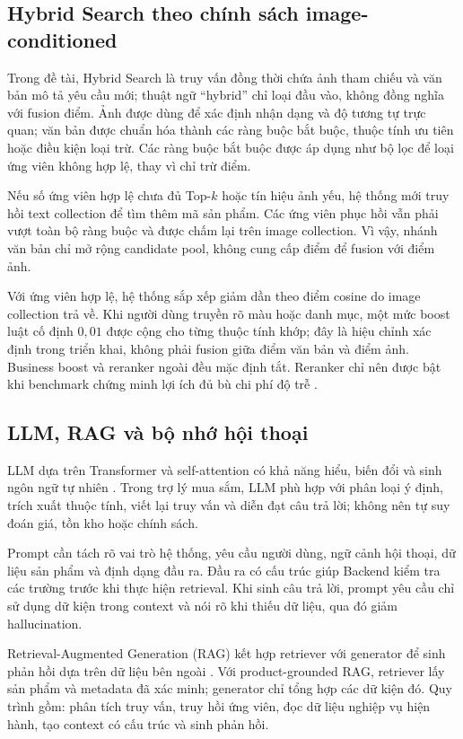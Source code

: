 \subsection{Hybrid Search theo chính sách image-conditioned}

Trong đề tài, Hybrid Search là truy vấn đồng thời chứa ảnh tham chiếu và văn bản mô tả
yêu cầu mới; thuật ngữ ``hybrid'' chỉ loại đầu vào, không đồng nghĩa với fusion điểm.
Ảnh được dùng để xác định nhận dạng và độ tương tự trực quan; văn bản được chuẩn hóa
thành các ràng buộc bắt buộc, thuộc tính ưu tiên hoặc điều kiện loại trừ. Các ràng buộc
bắt buộc được áp dụng như bộ lọc để loại ứng viên không hợp lệ, thay vì chỉ trừ điểm.

Nếu số ứng viên hợp lệ chưa đủ Top-$k$ hoặc tín hiệu ảnh yếu, hệ thống mới truy hồi text
collection để tìm thêm mã sản phẩm. Các ứng viên phục hồi vẫn phải vượt toàn bộ ràng
buộc và được chấm lại trên image collection. Vì vậy, nhánh văn bản chỉ mở rộng candidate
pool, không cung cấp điểm để fusion với điểm ảnh.

Với ứng viên hợp lệ, hệ thống sắp xếp giảm dần theo điểm cosine do image collection trả
về. Khi người dùng truyền rõ màu hoặc danh mục, một mức boost luật cố định $0{,}01$ được
cộng cho từng thuộc tính khớp; đây là hiệu chỉnh xác định trong triển khai, không phải
fusion giữa điểm văn bản và điểm ảnh. Business boost và reranker ngoài đều mặc định tắt.
Reranker chỉ nên được bật khi benchmark chứng minh lợi ích đủ bù chi phí độ trễ
\parencite{reranking_sbert}.

\subsection{LLM, RAG và bộ nhớ hội thoại}

LLM dựa trên Transformer và self-attention có khả năng hiểu, biến đổi và sinh ngôn ngữ
tự nhiên \parencite{vaswani2017attention}. Trong trợ lý mua sắm, LLM phù hợp với phân
loại ý định, trích xuất thuộc tính, viết lại truy vấn và diễn đạt câu trả lời; không nên
tự suy đoán giá, tồn kho hoặc chính sách.

Prompt cần tách rõ vai trò hệ thống, yêu cầu người dùng, ngữ cảnh hội thoại, dữ liệu sản
phẩm và định dạng đầu ra. Đầu ra có cấu trúc giúp Backend kiểm tra các trường trước khi
thực hiện retrieval. Khi sinh câu trả lời, prompt yêu cầu chỉ sử dụng dữ kiện trong
context và nói rõ khi thiếu dữ liệu, qua đó giảm hallucination.

Retrieval-Augmented Generation (RAG) kết hợp retriever với generator để sinh phản hồi
dựa trên dữ liệu bên ngoài \parencite{lewis2020rag}. Với product-grounded RAG, retriever
lấy sản phẩm và metadata đã xác minh; generator chỉ tổng hợp các dữ kiện đó. Quy trình
gồm: phân tích truy vấn, truy hồi ứng viên, đọc dữ liệu nghiệp vụ hiện hành, tạo context
có cấu trúc và sinh phản hồi.

